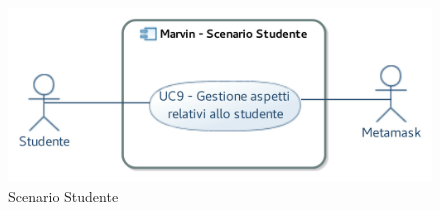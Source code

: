 \documentclass[AnalisiDeiRequisiti.tex]{subfiles}
\begin{document}
\begin{figure}[H]
	\centering
	\includegraphics[width=1.0\linewidth]{UC06.jpg}
	\caption{Scenario Studente}
	\label{fig:Scenario Studente}
\end{figure}

\end{document}
